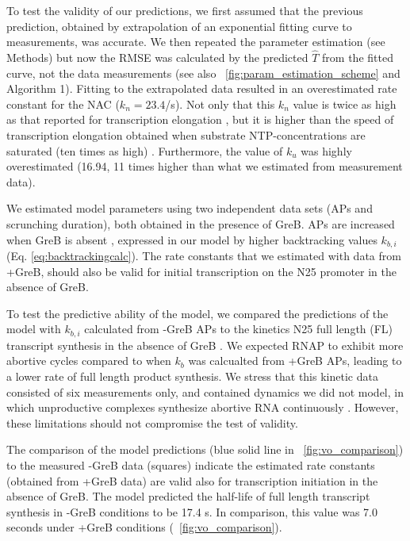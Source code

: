 To test the validity of our predictions, we first assumed that the previous
prediction, obtained by extrapolation of an exponential fitting
curve to measurements, was accurate. We then repeated the parameter
estimation (see Methods) but now the RMSE was calculated by the predicted
$\hat T$ from the fitted curve, not the data measurements (see also
\FIG~\ref{fig:param_estimation_scheme} and Algorithm 1). Fitting to the
extrapolated data resulted in an overestimated rate constant for the NAC
($k_n= 23.4$/s). Not only that this $k_n$ value is twice as high as that
reported for transcription elongation \cite{revyakin_abortive_2006}, but it is
higher than the speed of transcription elongation obtained when substrate
NTP-concentrations are saturated (ten times as high)
\cite{bai_mechanochemical_2007}. Furthermore, the value of $k_u$ was highly
overestimated (16.94, 11 times higher than what we estimated from measurement
data).



We estimated model parameters using two independent data sets (APs and
scrunching duration), both obtained in the presence of GreB. APs are increased
when GreB is absent \cite{hsu_initial_2006}, expressed in our model by higher
backtracking values $k_{b,i}$ (Eq. \ref{eq:backtrackingcalc}). The rate
constants that we estimated with data from +GreB, should also be valid for
initial transcription on the N25 promoter in the absence of GreB.  

To test the predictive ability of the model, we compared the predictions of
the model with $k_{b,i}$ calculated from -GreB APs \cite{hsu_initial_2006} to the
kinetics N25 full length (FL) transcript synthesis in the absence of GreB
\cite{vo_vitro_2003-1}. We expected RNAP to exhibit more abortive cycles
compared to when $k_b$ was calcualted from +GreB APs, leading to a lower rate
of full length product synthesis. We stress that this kinetic data consisted
of six measurements only, and contained dynamics we did not model, in which
unproductive complexes synthesize abortive RNA continuously
\cite{vo_vitro_2003-1}. However, these limitations should not compromise the
test of validity.
 
The comparison of the model predictions (blue solid line in
\FIG~\ref{fig:vo_comparison}) to the measured -GreB data (squares) indicate
the estimated rate constants (obtained from +GreB data) are valid also for
transcription initiation in the absence of GreB. The model
predicted the half-life of full length transcript synthesis in -GreB
conditions to be 17.4 s. In comparison, this value was 7.0 seconds under +GreB
conditions (\FIG~\ref{fig:vo_comparison}). 

